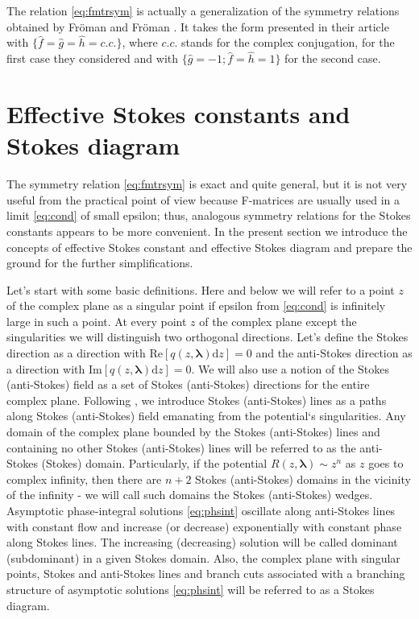 \documentclass[atmp]{ipart_v1}
\def\rmd{\mathrm{d}}
\def\lmbd{\bm{\lambda}}
\def\f{\hat{f}}
\def\g{\hat{g}}
\def\h{\hat{h}}
\def\unity{1}
\def\Re{\mathrm{Re}}
\def\Im{\mathrm{Im}}
\newcommand\eref[1]{\eqref{#1}}
\newcommand\phsintgrnd[1][z]{q(#1,\lmbd)}
\begin{document}
The relation \eref{eq:fmtrsym} is actually a generalization of the symmetry relations obtained by
Fr\"oman and Fr\"oman \cite{frpaper}. It takes the form presented in their article
with $\{\f = \g = \h = c.c.\}$, where $c.c.$ stands for the complex conjugation, for the
first case they considered and with $\{\g = -\unity; \f = \h = \unity\}$ for the second case.

\section{Effective Stokes constants and Stokes diagram \label{sec:effsd}}
The symmetry relation \eref{eq:fmtrsym} is exact and quite general, but it is not very useful
from the practical point of view because F-matrices are usually used in a limit \eref{eq:cond} of
small epsilon; thus, analogous symmetry relations for the Stokes constants appears to be more
convenient. In the present section we introduce the concepts of effective Stokes constant and
effective Stokes diagram and prepare the ground for the further simplifications.

Let's start with some basic definitions. Here and below we will refer to a point $z$ of the complex
plane as a singular point if epsilon from \eref{eq:cond} is infinitely large in such a point. At every point $z$ 
of the complex plane except the singularities we will distinguish two orthogonal directions. 
Let's define the Stokes direction 
as a direction with $\Re \left[ \phsintgrnd \rmd z \right]=0$ and the anti-Stokes direction 
as a direction with $\Im \left[ \phsintgrnd \rmd z \right]=0$. We will also use a notion of 
the Stokes (anti-Stokes) field as a set of Stokes (anti-Stokes) directions for the entire 
complex plane. Following \cite{heading, rwbook}, we introduce Stokes (anti-Stokes) lines as a 
paths along Stokes (anti-Stokes) field emanating from the potential`s singularities. 
Any domain of the complex plane bounded by the Stokes (anti-Stokes) lines and containing no other 
Stokes (anti-Stokes) lines will be referred to as the anti-Stokes (Stokes) domain. Particularly, if 
the potential $R(z,\lmbd) \sim z^n$ as $z$ goes to complex infinity, then there are $n+2$ Stokes 
(anti-Stokes) domains in the vicinity of the infinity - we will call such domains the Stokes 
(anti-Stokes) wedges. Asymptotic phase-integral solutions \eref{eq:phsint} oscillate along anti-Stokes 
lines with constant flow and increase (or decrease) exponentially with constant phase along Stokes lines. 
The increasing (decreasing) solution will be called dominant (subdominant) in a given Stokes domain. 
Also, the complex plane with singular points, Stokes and anti-Stokes 
lines and branch cuts associated with a branching structure of asymptotic solutions \eref{eq:phsint} 
will be referred to as a Stokes diagram.
\end{document}

